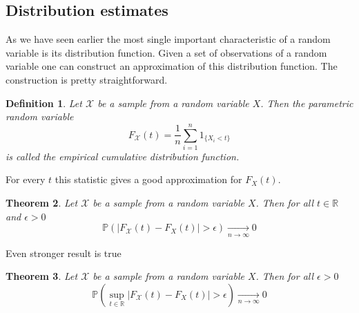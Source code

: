 \documentclass[12pt]{article}
\newtheorem{theorem}{Theorem}[subsection]
\newtheorem{definition}[theorem]{Definition}
\begin{document}
\subsection{Distribution estimates}

As we have seen earlier the most single important characteristic of a random
variable is its distribution function. Given a set of observations of a random
variable one can construct an approximation of this distribution function. The
construction is pretty straightforward.

\begin{definition} Let $\mathscr{X}$ be a sample from a random variable $X$.
    Then the parametric random variable
    $$
        F_{\mathscr{X}}(t)=\frac{1}{n}\sum_{i=1}^n 1_{\{X_i<t\}}
    $$
    is called the empirical cumulative distribution function.
\end{definition}

For every $t$ this statistic gives a good approximation for $F_X(t)$.

\begin{theorem} Let $\mathscr{X}$ be a sample from a random variable $X$. Then
    for all $t\in\mathbb{R}$ and $\epsilon>0$
    $$
        \mathbb{P}(|F_{\mathscr{X}}(t)-F_X(t)|>\epsilon)
        \underset{n\to\infty}{\to}0
    $$
\end{theorem}

Even stronger result is true

\begin{theorem} Let $\mathscr{X}$ be a sample from a random variable $X$. Then
    for all $\epsilon>0$
    $$
        \mathbb{P}\left(\sup_{t\in\mathbb{R}}|
        F_{\mathscr{X}}(t)-F_X(t)|>\epsilon\right)\underset{n\to\infty}{\to}0
    $$
\end{theorem}
\end{document}
